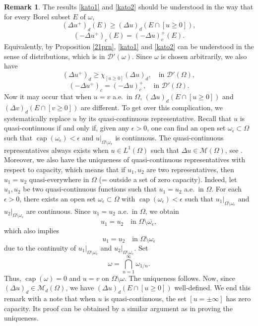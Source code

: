 \documentclass[a4paper, 11pt]{report}
\theoremstyle{definition}\newtheorem*{rmk}{Remark}
\DeclareMathOperator{\capa}{cap}
\begin{document}
\begin{rmk}
The results \eqref{kato1} and \eqref{kato2} should be understood in the way that for every Borel subset $E$ of $\omega$,
\[
(\Delta u^+)_d (E) \ge (\Delta u)_d(E \cap [u\ge 0]),
\]
\[
(-\Delta u^+)_c (E) = (-\Delta u)_c^+ (E).
\]
Equivalently, by Proposition \ref{21prn}, \eqref{kato1} and \eqref{kato2} can be understood in the sense of distributions, which is in $\mathcal{D}'(\omega)$. Since $\omega$ is chosen arbitrarily, we also have
\[
(\Delta u^+)_d \ge \chi_{[u \ge 0]}(\Delta u)_d, \quad\text{in }\mathcal{D}'(\Omega),
\]
\[
(-\Delta u^+)_c = (-\Delta u)_c^+, \quad\text{in }\mathcal{D}'(\Omega).
\]
Now it may occur that when $u = v$ a.e.\ in $\Omega$, $(\Delta u)_d(E \cap [u\ge 0])$ and $(\Delta v)_d(E \cap [v\ge 0])$ are different. To get over this complication, we systematically replace $u$ by its quasi-continuous representative. Recall that $u$ is quasi-continuous if and only if, given any $\epsilon > 0$, one can find an open set $\omega_{\epsilon} \subset \Omega$ such that $\capa(\omega_{\epsilon}) < \epsilon$ and $u|_{\Omega \setminus \omega_{\epsilon}}$ is continuous. The quasi-continuous representatives always exists when $u\in L^1(\Omega)$ such that $\Delta u \in \mathcal{M}(\Omega)$, see \cite[Lemma 1]{BP2}. Moreover, we also have the uniqueness of quasi-continuous representatives with respect to capacity, which means that if $u_1,u_2$ are two representatives, then $u_1 = u_2$ quasi-everywhere in $\Omega$ (= outside a set of zero capacity). Indeed, let $u_1,u_2$ be two quasi-continuous functions such that $u_1 = u_2$ a.e.\ in $\Omega$. For each $\epsilon > 0$, there exists an open set $\omega_{\epsilon} \subset \Omega$ with $\capa(\omega_{\epsilon}) < \epsilon$ such that $u_1|_{\Omega \setminus \omega_{\epsilon}}$ and $u_2|_{\Omega \setminus \omega_{\epsilon}}$ are continuous. Since $u_1 = u_2$ a.e.\ in $\Omega$, we obtain
\[
u_1 = u_2 \quad\text{in }\Omega \setminus \overline{\omega_{\epsilon}},
\]
which also implies
\[
u_1 = u_2 \quad\text{in }\Omega \setminus \omega_{\epsilon}
\]
due to the continuity of $u_1|_{\Omega \setminus \omega_{\epsilon}}$ and $u_2|_{\Omega \setminus \omega_{\epsilon}}$. Set
\[
\omega = \bigcap\limits_{n = 1}^{\infty} \omega_{1/n}.
\]
Thus, $\capa(\omega) = 0$ and $u = v$ on $\Omega \setminus \omega$. The uniqueness follows. Now, since $(\Delta u)_d \in \mathcal{M}_d(\Omega)$, we have $(\Delta u)_d(E \cap [u\ge 0])$ well-defined. We end this remark with a note that when $u$ is quasi-continuous, the set $[u = \pm \infty]$ has zero capacity. Its proof can be obtained by a similar argument as in proving the uniqueness.
\end{rmk}
\end{document}
